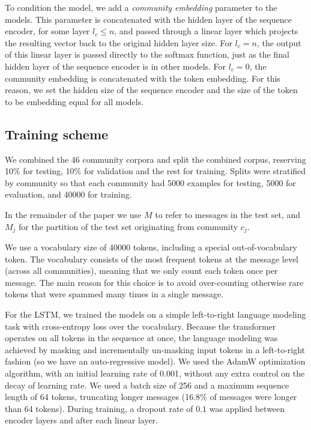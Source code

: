 \documentclass[11pt,a4paper]{article}
\newcommand\jp[1]{\todo[backgroundcolor=blue!10]{JP: #1}}
\begin{document}
To condition the model, we add a \emph{community embedding} parameter to the models.
This parameter is concatenated with the hidden layer of the sequence encoder,
for some layer $l_c \leq n$, and passed through a linear layer 
which projects the resulting vector back to the original hidden layer size.
For $l_c = n$, the output of this linear layer is passed directly to the softmax function,
just as the final hidden layer of the sequence encoder is in other models.
For $l_c=0$, the community embedding is concatenated with the token embedding.
For this reason, we set the hidden size of the sequence encoder 
and the size of the token to be embedding equal for all models.


\subsection{Training scheme}

We combined the 46 community corpora and split the combined corpus,
reserving 10\% for testing, 10\% for validation and the rest for training.
Splits were stratified by community so that each community had \num{5000} examples
for testing, \num{5000} for evaluation, and \num{40000} for training.

In the remainder of the paper we use $M$ to refer to messages in the test set,
and $M_j$ for the partition of the test set originating from community $c_j$.

We use a vocabulary size of \num{40000} tokens, including a special out-of-vocabulary token.
The vocabulary consists of the most frequent tokens at the message level (across all communities),
meaning that we only count each token once per message.
The main reason for this choice is to avoid over-counting otherwise rare tokens that were spammed
many times in a single message.

For the LSTM, we trained the models on a simple left-to-right language modeling task
with cross-entropy loss over the vocabulary. 
Because the transformer operates on all tokens in the sequence at once,
the language modeling was achieved by masking and incrementally un-masking input tokens
in a left-to-right fashion (so we have an auto-regressive\jp{check} model).
We used the AdamW \citep{Loshchilov2019} optimization algorithm,
with an initial learning rate of \num{0.001}, without any extra control on the decay of learning rate.
We used a batch size of \num{256} and a maximum sequence length of \num{64} tokens, 
truncating longer messages (16.8\% of messages were longer than \num{64} tokens).
During training, a dropout rate of $0.1$ was applied between encoder layers 
and after each linear layer.
\end{document}
